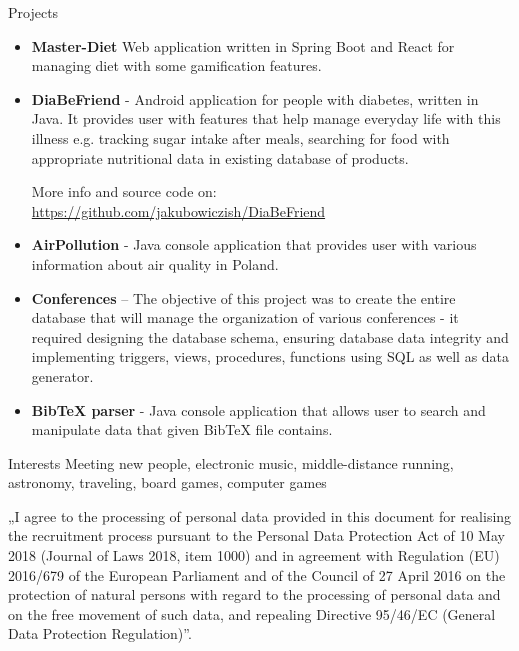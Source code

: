 \documentclass{resume} %
\begin{document}
\begin{rSection}{Projects}
\begin{itemize}
 \setlength\itemsep{0em}

\item \textbf{Master-Diet} Web application written in Spring Boot and React for managing diet with some gamification features.

\item \textbf{DiaBeFriend} - Android application for people with diabetes, written in Java.
It provides user with features that
help manage everyday life with this illness e.g. tracking sugar intake after meals, searching for food with appropriate nutritional data in existing database of products.

 More info and source code on: \url{https://github.com/jakubowiczish/DiaBeFriend}

\item \textbf{AirPollution} - Java console application that provides user with various information about air quality in Poland.

\item \textbf{Conferences} – The objective of this project was to create the entire database that will manage the organization
of various conferences - it required designing the database schema, ensuring database data integrity and
implementing triggers, views, procedures, functions using SQL as well as data generator.

\item \textbf{BibTeX parser} - Java console application that allows user to search and manipulate data that given BibTeX file
contains.
\end{itemize}
\end{rSection}


\begin{rSection}{Interests}
Meeting new people, electronic music, middle-distance running, astronomy, traveling, board games, computer games
\end{rSection}


\vfill
\footnotesize „I agree to the processing of personal data provided in this document for realising the recruitment process
pursuant to the Personal Data Protection Act of 10 May 2018 (Journal of Laws 2018, item 1000) and in
agreement with Regulation (EU) 2016/679 of the European Parliament and of the Council of 27 April 2016 on
the protection of natural persons with regard to the processing of personal data and on the free movement of
such data, and repealing Directive 95/46/EC (General Data Protection Regulation)”.
\end{document}
